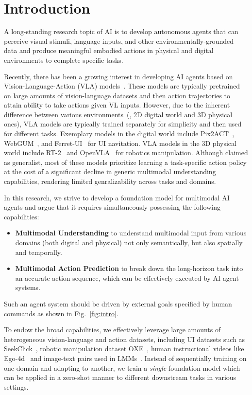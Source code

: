 \section{Introduction}
\label{sec:intro}
A long-standing research topic of AI is to develop autonomous agents that can perceive visual stimuli, language inputs, and other environmentally-grounded data and produce meaningful embodied actions in physical and digital environments to complete specific tasks.

Recently, there has been a growing interest in developing AI agents based on Vision-Language-Action (VLA) models~\cite{kim2024openvla,driess2023palm, brohan2022rt,brohan2023rt,hong2023cogagent,seeclick}. These models are typically pretrained on large amounts of vision-language datasets and then action trajectories to attain ability to take actions given VL inputs. However, due to the inherent difference between various environments~(\eg, 2D digital world and 3D physical ones), VLA models are typically trained separately for simplicity and then used for different tasks. Exemplary models in the digital world include Pix2ACT~\cite{shaw2023pixels}, WebGUM~\cite{furuta2023multimodal}, and Ferret-UI~\cite{you2023ferret} for UI navitation. VLA models in the 3D physical world include RT-2~\cite{brohan2022rt} and OpenVLA~\cite{kim2024openvla} for robotics manipulation.
Although claimed as generalist, most of these models prioritize learning a task-specific action policy at the cost of a significant decline in generic multimodal understanding capabilities, rendering limited genralizability across tasks and domains. 

In this research, we strive to develop a foundation model for multimodal AI agents and argue that it requires simultaneously possessing the following capabilities:
\begin{itemize}
    \item \textbf{Multimodal Understanding} to understand multimodal input from various domains (both digital and physical) not only semantically, but also spatially and temporally.
    \item \textbf{Multimodal Action Prediction} to break down the long-horizon task into an accurate action sequence, which can be effectively executed by AI agent systems.
\end{itemize}
Such an agent system should be driven by external goals specified by human commands as shown in Fig.~\ref{fig:intro}.

To endow the broad capabilities, we effectively leverage large amounts of heterogeneous vision-language and action datasets, including UI datasets such as SeekClick~\cite{seeclick}, robotic manipulation dataset OXE~\cite{open_x_embodiment_rt_x_2023}, human instructional videos like Ego-4d~\cite{grauman2022ego4dworld3000hours} and image-text pairs used in LMMs~\cite{liu2023llava,chen2023sharegpt4v}. Instead of sequentially training on one domain and adapting to another, we train a \textit{single} foundation model which can be applied in a zero-shot manner to different downstream tasks in various settings.

